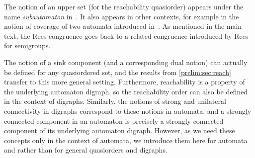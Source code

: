 The notion of an upper set (for the reachability quasiorder)
appears under the name \emph{subautomaton} in~\cite{Rystsov97}.
It also appears in other contexts, for example in the notion of
coverage of two automata introduced in~\cite{DBLP:journals/dm/BrzozowskiS73}.
As mentioned in the main text, the Rees congruence goes back to
a related congruence introduced by Rees~\cite{Rees40} for semigroups.

The notion of a sink component (and a corresponding dual notion) can actually be defined
for any quasiordered set, and the results from \cref{prelim:sec:reach}
transfer to this more general setting. Furthermore, reachability is a property of the underlying automaton digraph, so the reachability order can also be defined in the context of digraphs.
Similarly,
the notions of strong and unilateral connectivity in digraphs
correspond to these notions in automata,
and a strongly connected component in an automaton is precisely
a strongly connected component of its underlying automaton digraph.
However, as we need these concepts only in the context of automata,
we introduce them here for automata and rather than for general quasiorders and digraphs.
